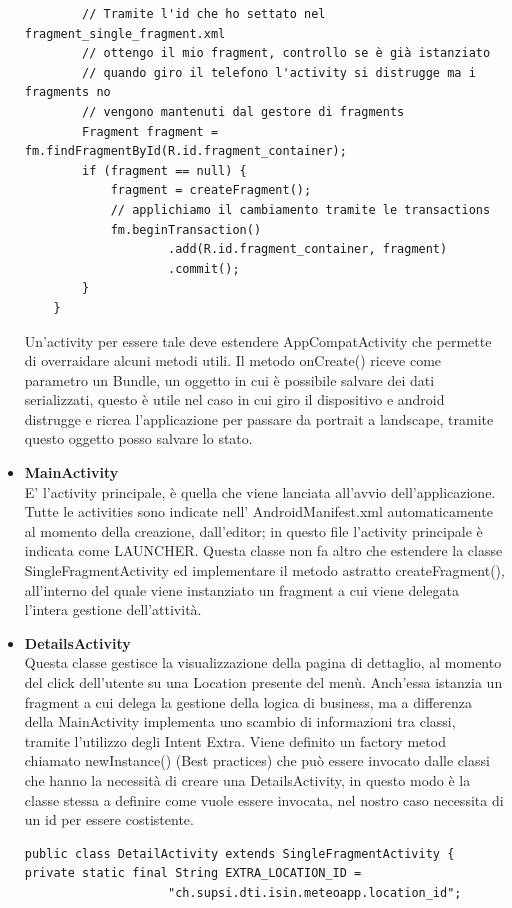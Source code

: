 \documentclass{article}
\begin{document}
\begin{itemize}
\begin{lstlisting}
        // Tramite l'id che ho settato nel fragment_single_fragment.xml 
        // ottengo il mio fragment, controllo se è già istanziato
        // quando giro il telefono l'activity si distrugge ma i fragments no
        // vengono mantenuti dal gestore di fragments
        Fragment fragment = fm.findFragmentById(R.id.fragment_container);
        if (fragment == null) {
            fragment = createFragment();
            // applichiamo il cambiamento tramite le transactions
            fm.beginTransaction()
                    .add(R.id.fragment_container, fragment)
                    .commit();
        }
    }
    \end{lstlisting}
    Un'activity per essere tale deve estendere AppCompatActivity che permette di overraidare alcuni metodi utili.
    Il metodo onCreate() riceve come parametro un Bundle, un oggetto in cui è possibile salvare dei dati serializzati, questo è utile nel caso in cui giro il dispositivo
    e android distrugge e ricrea l'applicazione per passare da portrait a landscape, tramite questo oggetto posso salvare lo stato.
    \item \textbf{MainActivity} \\
    E' l'activity principale, è quella che viene lanciata all'avvio dell'applicazione. Tutte le activities sono indicate nell' AndroidManifest.xml
    automaticamente al momento della creazione, dall'editor; in questo file l'activity principale è indicata come LAUNCHER.
    Questa classe non fa altro che estendere la classe SingleFragmentActivity ed implementare il metodo astratto
    createFragment(), all'interno del quale viene instanziato un fragment a cui viene delegata l'intera gestione dell'attività.
    \item \textbf{DetailsActivity} \\
    Questa classe gestisce la visualizzazione della pagina di dettaglio, al momento del click dell'utente su una Location presente del menù.
    Anch'essa istanzia un fragment a cui delega la gestione della logica di business, ma a differenza della MainActivity implementa uno scambio di informazioni tra classi, tramite 
    l'utilizzo degli Intent Extra. Viene definito un factory metod chiamato newInstance() (Best practices) che può essere invocato dalle classi che hanno la necessità di 
    creare una DetailsActivity, in questo modo è la classe stessa a definire come vuole essere invocata, nel nostro caso necessita di un id per essere costistente.
    \begin{lstlisting}
public class DetailActivity extends SingleFragmentActivity {
private static final String EXTRA_LOCATION_ID = 
                    "ch.supsi.dti.isin.meteoapp.location_id";


\end{lstlisting}
\end{itemize}
\end{document}
